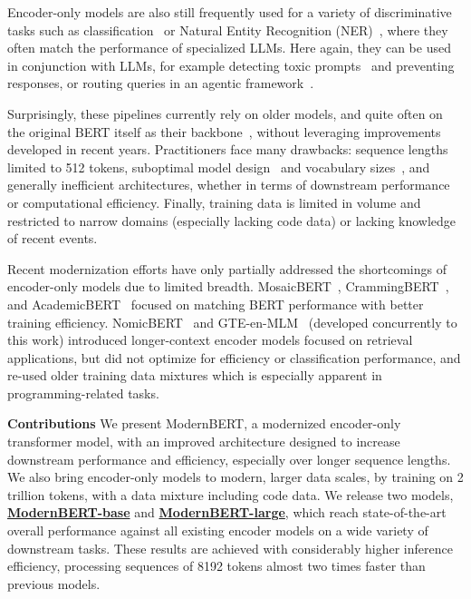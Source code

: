 \documentclass[11pt]{article}
\begin{document}
Encoder-only models are also still frequently used for a variety of discriminative tasks such as classification~\cite{setfit} or Natural Entity Recognition (NER)~\cite{gliner}, where they often match the performance of specialized LLMs. Here again, they can be used in conjunction with LLMs, for example detecting toxic prompts~\cite{beavertails, wildjailbreak} and preventing responses, or routing queries in an agentic framework~\cite{react, toolformer}.

Surprisingly, these pipelines currently rely on older models, and quite often on the original BERT itself as their backbone~\cite{e5,bge}, without leveraging improvements developed in recent years. Practitioners face many drawbacks: sequence lengths limited to 512 tokens, suboptimal model design~\cite{codesigning} and vocabulary sizes~\cite{karpathy}, and generally inefficient architectures, whether in terms of downstream performance or computational efficiency. Finally, training data is limited in volume and restricted to narrow domains (especially lacking code data) or lacking knowledge of recent events. 

Recent modernization efforts have only partially addressed the shortcomings of encoder-only models due to limited breadth. MosaicBERT~\cite{mosaic}, CrammingBERT~\cite{crammingbert}, and AcademicBERT~\cite{academicbudget} focused on matching BERT performance with better training efficiency. NomicBERT~\cite{nomic} and GTE-en-MLM~\cite{gte} (developed concurrently to this work) introduced longer-context encoder models focused on retrieval applications, but did not optimize for efficiency or classification performance, and re-used older training data mixtures which is especially apparent in programming-related tasks. 

\textbf{Contributions} We present ModernBERT, a modernized encoder-only transformer model, with an improved architecture designed to increase downstream performance and efficiency, especially over longer sequence lengths. We also bring encoder-only models to modern, larger data scales, by training on 2 trillion tokens, with a data mixture including code data. We release two models, \href{https://huggingface.co/answerdotai/ModernBERT-base}{\textbf{ModernBERT-base}} and \href{https://huggingface.co/answerdotai/ModernBERT-large}{\textbf{ModernBERT-large}}, which reach state-of-the-art overall performance against all existing encoder models on a wide variety of downstream tasks. These results are achieved with considerably higher inference efficiency, processing sequences of 8192 tokens almost two times faster than previous models.
\end{document}
